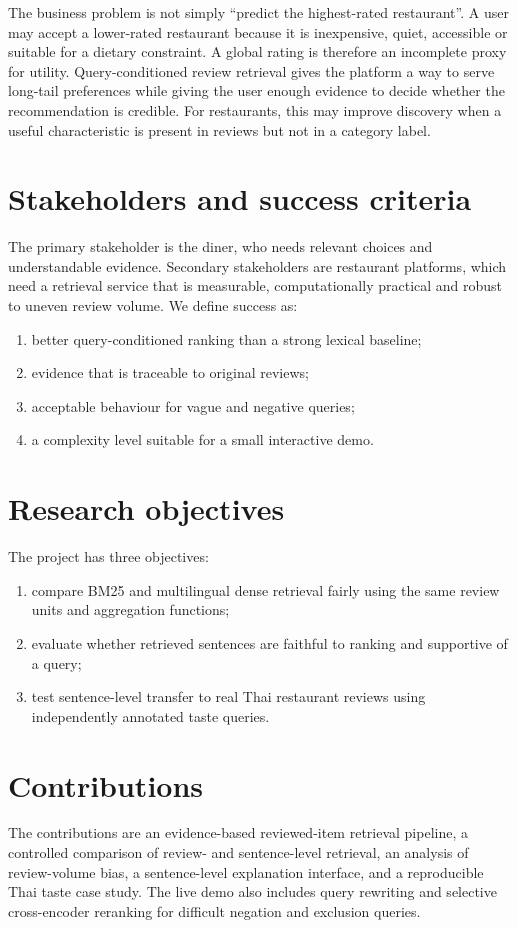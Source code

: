 The business problem is not simply ``predict the highest-rated restaurant''. A user may accept
a lower-rated restaurant because it is inexpensive, quiet, accessible or suitable for a dietary
constraint. A global rating is therefore an incomplete proxy for utility. Query-conditioned
review retrieval gives the platform a way to serve long-tail preferences while giving the user
enough evidence to decide whether the recommendation is credible. For restaurants, this may
improve discovery when a useful characteristic is present in reviews but not in a category
label.

\section{Stakeholders and success criteria}
The primary stakeholder is the diner, who needs relevant choices and understandable evidence.
Secondary stakeholders are restaurant platforms, which need a retrieval service that is
measurable, computationally practical and robust to uneven review volume. We define success as:
\begin{enumerate}
  \item better query-conditioned ranking than a strong lexical baseline;
  \item evidence that is traceable to original reviews;
  \item acceptable behaviour for vague and negative queries;
  \item a complexity level suitable for a small interactive demo.
\end{enumerate}

\section{Research objectives}
The project has three objectives:
\begin{enumerate}
  \item compare BM25 and multilingual dense retrieval fairly using the same review units and
  aggregation functions;
  \item evaluate whether retrieved sentences are faithful to ranking and supportive of a query;
  \item test sentence-level transfer to real Thai restaurant reviews using independently
  annotated taste queries.
\end{enumerate}

\section{Contributions}
The contributions are an evidence-based reviewed-item retrieval pipeline, a controlled
comparison of review- and sentence-level retrieval, an analysis of review-volume bias, a
sentence-level explanation interface, and a reproducible Thai taste case study. The live demo
also includes query rewriting and selective cross-encoder reranking for difficult negation and
exclusion queries.

